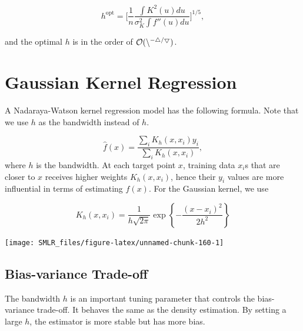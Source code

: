 \documentclass[
]{book}
\theoremstyle{definition}
\theoremstyle{definition}
\theoremstyle{definition}
\theoremstyle{definition}
\theoremstyle{remark}
\begin{document}
\[h^\text{opt} = \bigg[\frac{1}{n} \frac{\int K^2(u)du}{ \sigma^2_K \int f''(u)du} \bigg]^{1/5},\]

and the optimal \(h\) is in the order of \(\cal O(n^{-4/5})\).

\hypertarget{gaussian-kernel-regression}{%
\section{Gaussian Kernel Regression}\label{gaussian-kernel-regression}}

A Nadaraya-Watson kernel regression model has the following formula. Note that we use \(h\) as the bandwidth instead of \(h\).

\[\widehat f(x) = \frac{\sum_i K_h(x, x_i) y_i}{\sum_i K_h(x, x_i)},\]
where \(h\) is the bandwidth. At each target point \(x\), training data \(x_i\)s that are closer to \(x\) receives higher weights \(K_h(x, x_i)\), hence their \(y_i\) values are more influential in terms of estimating \(f(x)\). For the Gaussian kernel, we use

\[K_h(x, x_i) = \frac{1}{h\sqrt{2\pi}} \exp\left\{ -\frac{(x - x_i)^2}{2 h^2}\right\}\]

\begin{center}\texttt{[image: SMLR\_files/figure-latex/unnamed-chunk-160-1]} \end{center}

\hypertarget{bias-variance-trade-off-1}{%
\subsection{Bias-variance Trade-off}\label{bias-variance-trade-off-1}}

The bandwidth \(h\) is an important tuning parameter that controls the bias-variance trade-off. It behaves the same as the density estimation. By setting a large \(h\), the estimator is more stable but has more bias.
\end{document}
